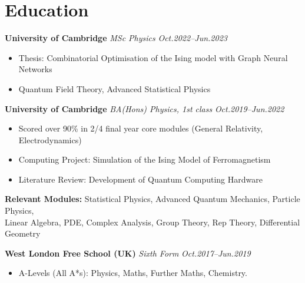\documentclass[11pt,a4paper,roman]{moderncv}        %
\begin{document}
\makecvtitle

\section{Education}

\textbf{University of Cambridge} \textit{MSc Physics} \hfill \textit{Oct.2022--Jun.2023}
\vspace*{1mm}
\begin{itemize}
	\item Thesis: Combinatorial Optimisation of the Ising model with Graph Neural Networks
	\item Quantum Field Theory, Advanced Statistical Physics
\end{itemize}

\vspace*{3mm}


\textbf{University of Cambridge} \textit{BA(Hons) Physics, 1st class} \hfill \textit{Oct.2019--Jun.2022}
\vspace*{1mm}
\begin{itemize}
	\item Scored over 90\% in 2/4 final year core modules (General Relativity, Electrodynamics)
	\item Computing Project: Simulation of the Ising Model of Ferromagnetism
	\item Literature Review: Development of Quantum Computing Hardware
\end{itemize}
\vspace*{1mm}
\textbf{Relevant Modules:} Statistical Physics, Advanced Quantum Mechanics, Particle Physics,\\
Linear Algebra, PDE, Complex Analysis, Group Theory, Rep Theory, Differential Geometry
\vspace*{3mm}

\textbf{West London Free School (UK)} \textit{Sixth Form} \hfill \textit{Oct.2017--Jun.2019}
\vspace*{1mm}
\begin{itemize}
	\item{A-Levels (All A*s): Physics, Maths, Further Maths, Chemistry.}
\end{itemize}
\vspace*{3mm}
\end{document}
